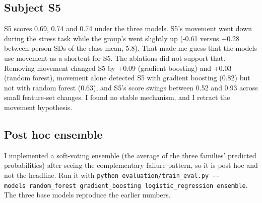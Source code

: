 \documentclass[11pt]{article}
\begin{document}
\hypertarget{subject-s5}{%
\subsection{Subject S5}\label{subject-s5}}

S5 scores 0.69, 0.74 and 0.74 under the three models. S5's movement went
down during the stress task while the group's went slightly up (-0.61
versus +0.28 between-person SDs of the class mean, 5.8). That made me
guess that the models use movement as a shortcut for S5. The ablations
did not support that. Removing movement changed S5 by +0.09 (gradient
boosting) and +0.03 (random forest), movement alone detected S5 with
gradient boosting (0.82) but not with random forest (0.63), and S5's
score swings between 0.52 and 0.93 across small feature-set changes. I
found no stable mechanism, and I retract the movement hypothesis.

\hypertarget{post-hoc-ensemble}{%
\subsection{Post hoc ensemble}\label{post-hoc-ensemble}}

I implemented a soft-voting ensemble (the average of the three families'
predicted probabilities) after seeing the complementary failure pattern,
so it is post hoc and not the headline. Run it with
\texttt{python\ evaluation/train\_eval.py\ -\/-models\ random\_forest\ gradient\_boosting\ logistic\_regression\ ensemble}.
The three base models reproduce the earlier numbers.
\end{document}
